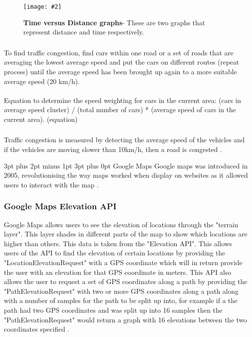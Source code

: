 \documentclass[12pt,a4paper]{article}
\makeatletter
\newcommand{\figuremacro}[5]{
    \begin{figure}[#1]
        \centering
        \texttt{[image: \#2]}
        \caption[#3]{\textbf{#3}#4}
        \label{fig:#2}
    \end{figure}
}
\renewcommand\subsection{\@startsection {subsection}{1}{2mm} %
                               {3pt plus 2pt minus 1pt} %
                               {3pt plus 0pt} %
                               {\normalfont\bfseries}}
\makeatother
\begin{document}
\newpage

\figuremacro{h}{TimevsDistanceWeightFactors}{Time versus Distance graphs}{- These are two graphs that represent distance and time respectively.}{1.0} 

\subsubsection{}To find traffic congestion, find cars within one road or a set of roads that are averaging the lowest average speed and put the cars on different routes (repeat process) until the average speed has been brought up again to a more suitable average speed (20 km/h). \cite{Zheng2018}

\paragraph{}
 Equation to determine the speed weighting for cars in the current area: (cars in average speed cluster) / (total number of cars) * (average speed of cars in the current area). (equation) \cite{Zheng2018}
\subsubsection{}Traffic congestion is measured by detecting the average speed of the vehicles and if the vehicles are moving slower than 10km/h, then a road is congested \cite{DAndrea2017}.

\subsection{Google Maps}
Google maps was introduced in 2005, revolutionising the way maps worked when display on websites as it allowed users to interact with the map \cite{Svennerberg2010}.
\subsubsection{Google Maps Elevation API}
Google Maps allows users to see the elevation of locations through the "terrain layer". This layer shades in different parts of the map to show which locations are higher than others. This data is taken from the "Elevation API". This allows users of the API to find the elevation of certain locations by providing the "LocationElevationRequest" with a GPS coordinate which will in return provide the user with an elevation for that GPS coordinate in meters. This API also allows the user to request a set of GPS coordinates along a path by providing the "PathElevationRequest" with two or more GPS coordinates along a path along with a number of samples for the path to be split up into, for example if a the path had two GPS coordinates and was split up into 16 samples then the "PathElevationRequest" would return a graph with 16 elevations between the two coordinates specified \cite{googleElevation}.
\end{document}
